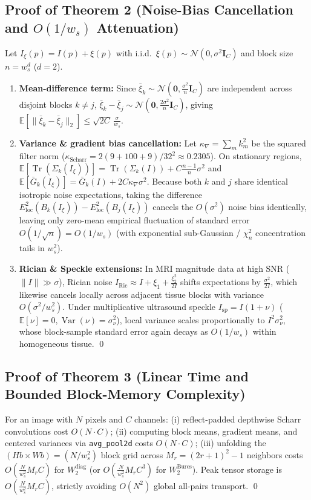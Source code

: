 \subsection{Proof of Theorem 2 (Noise-Bias Cancellation and $O(1/w_s)$ Attenuation)}
Let $I_\xi(p) = I(p) + \xi(p)$ with i.i.d.\ $\xi(p) \sim \mathcal{N}(0, \sigma^2 \mathbf{I}_C)$ and block size $n = w_s^d$ ($d=2$).
\begin{enumerate}
    \item \textbf{Mean-difference term:} Since $\bar{\xi}_k \sim \mathcal{N}(\mathbf{0}, \frac{\sigma^2}{n}\mathbf{I}_C)$ are independent across disjoint blocks $k \neq j$, $\bar{\xi}_k - \bar{\xi}_j \sim \mathcal{N}(\mathbf{0}, \frac{2\sigma^2}{n}\mathbf{I}_C)$, giving $\mathbb{E}[\lVert \bar{\xi}_k - \bar{\xi}_j \rVert_2] \le \sqrt{2C}\,\frac{\sigma}{w_s}$.
    \item \textbf{Variance \& gradient bias cancellation:} Let $\kappa_\nabla = \sum_m k_m^2$ be the squared filter norm ($\kappa_{\mathrm{Scharr}} = 2(9+100+9)/32^2 \approx 0.2305$). On stationary regions, $\mathbb{E}[\operatorname{Tr}(\Sigma_k(I_\xi))] = \operatorname{Tr}(\Sigma_k(I)) + C\frac{n-1}{n}\sigma^2$ and $\mathbb{E}[\bar{G}_k(I_\xi)] = \bar{G}_k(I) + 2C\kappa_\nabla \sigma^2$. Because both $k$ and $j$ share identical isotropic noise expectations, taking the difference $E_{\mathrm{loc}}^2(B_k(I_\xi)) - E_{\mathrm{loc}}^2(B_j(I_\xi))$ cancels the $O(\sigma^2)$ noise bias identically, leaving only zero-mean empirical fluctuation of standard error $O(1/\sqrt{n}) = O(1/w_s)$ (with exponential sub-Gaussian / $\chi^2_n$ concentration tails in $w_s^2$).
    \item \textbf{Rician \& Speckle extensions:} In MRI magnitude data at high SNR ($\lVert I \rVert \gg \sigma$), Rician noise $I_{\mathrm{Ric}} \approx I + \xi_1 + \frac{\xi_2^2}{2I}$ shifts expectations by $\frac{\sigma^2}{2I}$, which likewise cancels locally across adjacent tissue blocks with variance $O(\sigma^2 / w_s^2)$. Under multiplicative ultrasound speckle $I_{\mathrm{sp}} = I(1 + \nu)$ ($\mathbb{E}[\nu]=0, \operatorname{Var}(\nu)=\sigma_\nu^2$), local variance scales proportionally to $I^2 \sigma_\nu^2$, whose block-sample standard error again decays as $O(1/w_s)$ within homogeneous tissue. \qed
\end{enumerate}

\subsection{Proof of Theorem 3 (Linear Time and Bounded Block-Memory Complexity)}
For an image with $N$ pixels and $C$ channels: (i) reflect-padded depthwise Scharr convolutions cost $O(N \cdot C)$; (ii) computing block means, gradient means, and centered variances via \texttt{avg\_pool2d} costs $O(N \cdot C)$; (iii) unfolding the $(Hb \times Wb) = (N/w_s^2)$ block grid across $M_r = (2r+1)^2 - 1$ neighbors costs $O(\frac{N}{w_s^2} M_r C)$ for $W_2^{\mathrm{diag}}$ (or $O(\frac{N}{w_s^2} M_r C^3)$ for $W_2^{\mathrm{Bures}}$). Peak tensor storage is $O(\frac{N}{w_s^2} M_r C)$, strictly avoiding $O(N^2)$ global all-pairs transport. \qed

